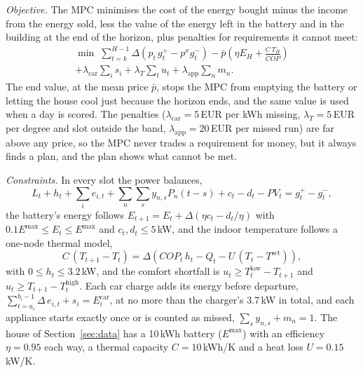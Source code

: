 \documentclass[12pt,a4paper]{report}
\begin{document}
\textit{Objective.} The MPC minimises the cost of the energy bought
minus the income from the energy sold, less the value of the energy left
in the battery and in the building at the end of the horizon, plus
penalties for requirements it cannot meet:
\begin{multline}
\min \; \sum_{t=k}^{H-1} \Delta \left(p_t\, g^{+}_t - p^{x} g^{-}_t\right)
 - \bar{p}\left(\eta E_H + \frac{C\, T_H}{\overline{\mathit{COP}}}\right) \\
 + \lambda_{\mathrm{car}} \sum_i s_i + \lambda_{T} \sum_t u_t
 + \lambda_{\mathrm{app}} \sum_n m_n .
\label{eq:mpcobj}
\end{multline}
The end value, at the mean price $\bar{p}$, stops the MPC from emptying
the battery or letting the house cool just because the horizon ends,
and the same value is used when a day is scored. The penalties
($\lambda_{\mathrm{car}} = 5$\,EUR per kWh missing, $\lambda_T = 5$\,EUR per
degree and slot outside the band, $\lambda_{\mathrm{app}} = 20$\,EUR per
missed run) are far above any price, so the MPC never trades a
requirement for money, but it always finds a plan, and the plan shows
what cannot be met.

\textit{Constraints.} In every slot the power balances,
\begin{equation}
L_t + h_t + \sum_i e_{i,t} + \sum_n \sum_s y_{n,s} P_n(t-s) + c_t - d_t
 - \mathit{PV}_t = g^{+}_t - g^{-}_t ,
\label{eq:mpcbalance}
\end{equation}
the battery's energy follows
$E_{t+1} = E_t + \Delta(\eta c_t - d_t/\eta)$ with
$0.1 E^{\max} \le E_t \le E^{\max}$ and $c_t, d_t \le 5$\,kW, and the
indoor temperature follows a one-node thermal model,
\begin{equation}
C\,(T_{t+1} - T_t) = \Delta\left(\mathit{COP}_t\, h_t - Q_t - U\,(T_t - T^{\mathrm{set}})\right),
\label{eq:mpcthermal}
\end{equation}
with $0 \le h_t \le 3.2$\,kW, and the comfort shortfall is
$u_t \ge T^{\mathrm{low}}_t - T_{t+1}$ and
$u_t \ge T_{t+1} - T^{\mathrm{high}}_t$. Each car charge adds its energy before
departure, $\sum_{t=a_i}^{b_i-1} \Delta\, e_{i,t} + s_i = E^{\mathrm{car}}_i$,
at no more than the charger's 3.7\,kW in total, and each appliance starts
exactly once or is counted as missed,
$\sum_s y_{n,s} + m_n = 1$. The house of Section~\ref{sec:data} has a
10\,kWh battery ($E^{\max}$) with an efficiency $\eta = 0.95$ each way, a
thermal capacity $C = 10$\,kWh/K and a heat loss $U = 0.15$\,kW/K.
\end{document}
